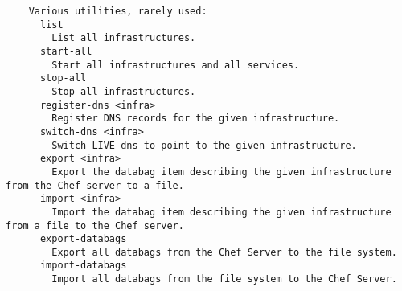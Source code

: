 \begin{verbatim}
    Various utilities, rarely used:
      list
        List all infrastructures.
      start-all
        Start all infrastructures and all services.
      stop-all
        Stop all infrastructures.
      register-dns <infra>
        Register DNS records for the given infrastructure.
      switch-dns <infra>
        Switch LIVE dns to point to the given infrastructure.
      export <infra>
        Export the databag item describing the given infrastructure from the Chef server to a file.
      import <infra>
        Import the databag item describing the given infrastructure from a file to the Chef server.
      export-databags
        Export all databags from the Chef Server to the file system.
      import-databags
        Import all databags from the file system to the Chef Server.
\end{verbatim}
